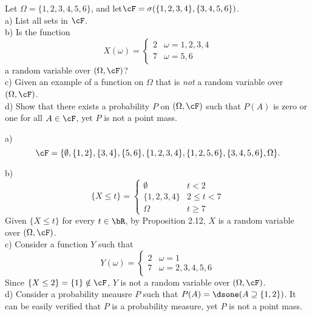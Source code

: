 \begin{exercise}
  Let $\Omega=\{1,2,3,4,5,6\}$, and let$\cF=\sigma(\{1,2,3,4\},\{3, 4, 5, 6\})$. \\
  a) List all sets in $\cF$. \\
  b) Is the function
    \[
      X(\omega) = \begin{cases}
        2 & \omega = 1, 2, 3, 4 \\
        7 & \omega = 5, 6
      \end{cases}
    \]
    a random variable over $(\Omega, \cF)$? \\
  c) Given an example of a function on $\Omega$ that is \textit{not} a random variable over $(\Omega, \cF)$. \\
  d) Show that there exists a probability $P$ on $(\Omega, \cF)$ such that $P(A)$ is zero or one for all $A\in\cF$, yet $P$ is not a point mass.
\end{exercise}
\begin{solution}
  a) \[ \cF = \{ \emptyset, \{1, 2\}, \{3, 4\}, \{5, 6\}, \{1, 2, 3, 4\}, \{1, 2, 5, 6\}, \{3, 4, 5, 6\}, \Omega \} .\]

  b) \[
       \{X\leq t\} = \begin{cases}
         \emptyset & t < 2 \\
         \{1, 2, 3, 4\} & 2 \leq t < 7 \\
         \Omega & t \geq 7
       \end{cases}
     \]
    Given $\{X\leq t\}$ for every $t\in\bR$, by Proposition 2.12, $X$ is a random variable over $(\Omega, \cF)$. \\

  c) Consider a function $Y$ such that
    \[
      Y(\omega) = \begin{cases}
        2 & \omega = 1 \\
        7 & \omega = 2, 3, 4, 5, 6
      \end{cases}
    \]
    Since $\{X\leq 2\} = \{1\}\notin\cF$, $Y$ is not a random variable over $(\Omega, \cF)$. \\

  d) Consider a probability meausre $P$ such that $P(A) = \dsone(A\supseteq\{1, 2\})$. It can be easily verified that $P$ is a probability measure, yet $P$ is not a point mass.

\end{solution}


